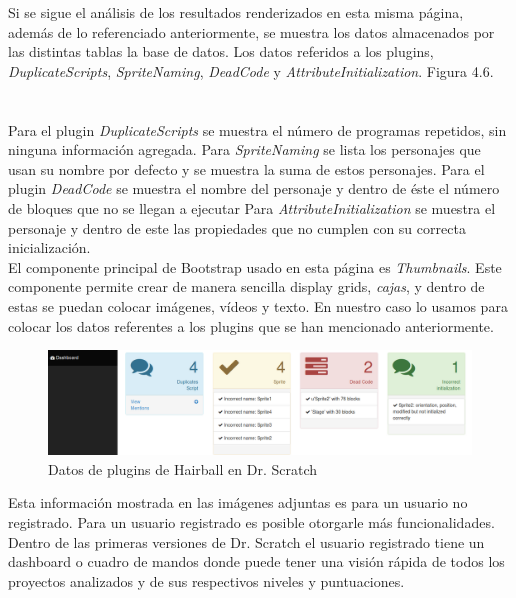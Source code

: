 \documentclass[a4paper, 12pt]{book}
\begin{document}
Si se sigue el análisis de los resultados renderizados en esta misma página, además de 
lo referenciado anteriormente, se muestra los datos almacenados por las distintas tablas
la base de datos.  Los datos referidos a los plugins, \emph{DuplicateScripts}, 
\emph{SpriteNaming}, \emph{DeadCode} y \emph{AttributeInitialization}. Figura 4.6. \\ \\ \\

Para el plugin \emph{DuplicateScripts} se muestra el número de programas repetidos, sin 
ninguna información agregada. Para \emph{SpriteNaming} se lista los personajes que usan
su nombre por defecto y se muestra la suma de estos personajes. 
Para el plugin \emph{DeadCode} se muestra el nombre del personaje y dentro de éste el 
número de bloques que no se llegan a ejecutar
Para \emph{AttributeInitialization} se muestra el personaje y dentro de este las 
propiedades que no cumplen con su correcta inicialización. \\

El componente principal de Bootstrap usado en esta página es \emph{Thumbnails}. Este
componente permite crear de manera sencilla display grids, \emph{cajas}, y dentro de
estas se puedan colocar imágenes, vídeos y texto. En nuestro caso lo usamos para
colocar los datos referentes a los plugins que se han mencionado anteriormente. 

 \begin{figure}
		\graphicspath{{img/}}
    \includegraphics[bb=0 0 800 600, width=12cm, keepaspectratio]{plugins.png}
		\caption{Datos de plugins de Hairball en Dr. Scratch}
    \label{figura:foro_hilos}
 \end{figure} 

Esta información mostrada en las imágenes adjuntas es para un usuario no registrado.
Para un usuario registrado es posible otorgarle más funcionalidades. Dentro de las
primeras versiones de Dr. Scratch el usuario registrado tiene un dashboard o cuadro
de mandos donde puede tener una visión rápida de todos los proyectos analizados y de
sus respectivos niveles y puntuaciones. \\
\end{document}
